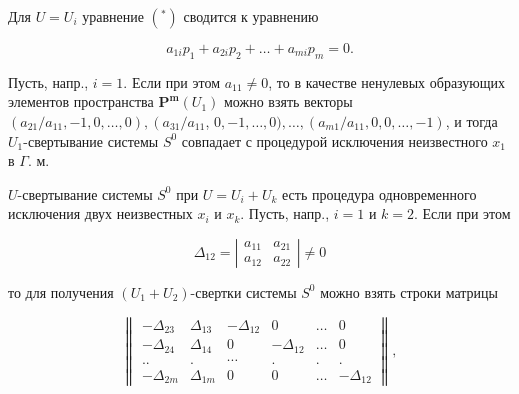 \documentclass[10pt]{article}
\begin{document}
Для $U=U_{i}$ уравнение $\left({ }^{*}\right)$ сводится к уравнению



\[

a_{1 i} p_{1}+a_{2 i} p_{2}+\ldots+a_{m i} p_{m}=0 .

\]



Пусть, напр., $i=1$. Если при этом $a_{11} \neq 0$, то в качестве ненулевых образующих элементов пространства $\boldsymbol{P}^{\boldsymbol{m}}\left(U_{1}\right)$ можно взять векторы $\left(a_{21} / a_{11},-1,0, \ldots, 0\right),\left(a_{31} / a_{11}\right.$, $0,-1, \ldots, 0), \ldots,\left(a_{m 1} / a_{11}, 0,0, \ldots,-1\right)$, и тогда $U_{1}$-свертывание системы $S^{0}$ совпадает с процедурой исключения неизвестного $x_{1}$ в $\Gamma$. м.



$U$-свертывание системы $S^{0}$ при $U=U_{i}+U_{k}$ есть процедура одновременного исключения двух неизвестных $x_{i}$ и $x_{k}$. Пусть, напр., $i=1$ и $k=2$. Если при этом



\[

\Delta_{12}=\left|\begin{array}{ll}

a_{11} & a_{21} \\

a_{12} & a_{22}

\end{array}\right| \neq 0

\]



то для получения $\left(U_{1}+U_{2}\right)$-свертки системы $S^{0}$ можно взять строки матрицы



\[

\left\|\begin{array}{cccccc}

-\Delta_{23} & \Delta_{13} & -\Delta_{12} & 0 & \ldots & 0 \\

-\Delta_{24} & \Delta_{14} & 0 & -\Delta_{12} & \ldots & 0 \\

. . & . & \cdots & . & . & . \\

-\Delta_{2 m} & \Delta_{1 m} & 0 & 0 & \ldots & -\Delta_{12}

\end{array}\right\|,

\]
\end{document}
